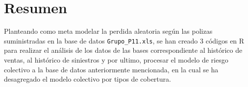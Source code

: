 \section{Resumen}

Planteando como meta modelar la perdida aleatoria según las polizas suministradas en la base de datos \texttt{Grupo\_P11.xls}, se han creado 3 códigos en R para realizar el análisis de los datos de las bases correspondiente al histórico de ventas, al histórico de siniestros y por ultimo, procesar el modelo de riesgo colectivo a la base de datos anteriormente mencionada, en la cual se ha desagregado el modelo colectivo por tipos de cobertura.